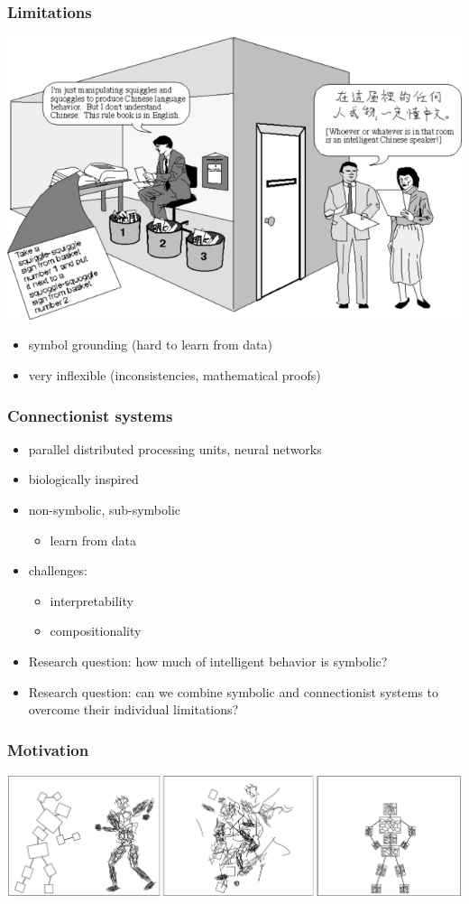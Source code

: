 \documentclass{beamer}
\begin{document}
\begin{frame}
  \frametitle{Limitations}
  \centerline{\includegraphics[width=.75\textwidth]{chinese-room.png}}  
  \begin{itemize}
  \item symbol grounding (hard to learn from data)
  \item very inflexible (inconsistencies, mathematical proofs)
  \end{itemize}
\end{frame}

\begin{frame}
  \frametitle{Connectionist systems}
  \begin{itemize}
  \item parallel distributed processing units, neural networks
  \item biologically inspired
  \item non-symbolic, sub-symbolic
    \begin{itemize}
    \item learn from data
    \end{itemize}
  \item challenges:
    \begin{itemize}
    \item interpretability
    \item compositionality
    \end{itemize}
  \item Research question: how much of intelligent behavior is
    symbolic?
  \item Research question: can we combine symbolic and connectionist
    systems to overcome their individual limitations?
  \end{itemize}
\end{frame}

\begin{frame}
  \frametitle{Motivation}
  \includegraphics[width=\textwidth]{minsky-figure.png}
\end{frame}
\end{document}
